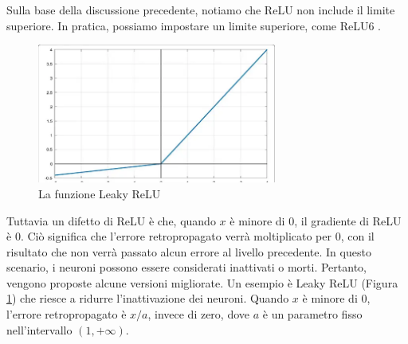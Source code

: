 Sulla base della discussione precedente, notiamo che ReLU non include il limite superiore. In pratica, 
possiamo impostare un limite superiore, come ReLU6 \cite{krizhevsky2010convolutional}.

\begin{figure}
    \centering
    \includegraphics[width=0.7\textwidth]{images/leaky-ReLU-activation-function-new.png}
    \caption{La funzione Leaky ReLU}
    \label{fig:leaky_relu}
\end{figure}
Tuttavia un difetto di ReLU è che, quando $x$ è minore di $0$, il gradiente di ReLU è $0$. Ciò significa che 
l'errore retropropagato verrà moltiplicato per $0$, con il risultato che non verrà passato alcun errore al livello
precedente.
In questo scenario, i neuroni possono essere considerati inattivati o morti.
Pertanto, vengono proposte alcune versioni migliorate. Un esempio è Leaky ReLU (Figura \ref{fig:leaky_relu}) che riesce 
a ridurre l'inattivazione dei neuroni.
Quando $x$ è minore di $0$, l'errore retropropagato è $x/a$, invece di zero, dove $a$ è un parametro fisso
nell'intervallo $(1, +\infty)$.

